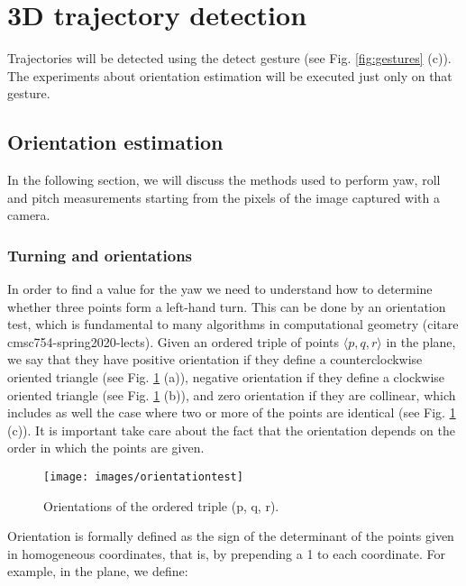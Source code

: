 \section{3D trajectory detection}
\label{sec:3dtraj}
Trajectories will be detected using the detect gesture (see Fig. \ref{fig:gestures} (c)). The experiments about orientation estimation will be executed just only on that gesture. 

\subsection{Orientation estimation}
\label{sec:orientationestimation}
In the following section, we will discuss the methods used to perform yaw, roll and pitch measurements starting from the pixels of the image captured with a camera.

\subsubsection{Turning and orientations}
\label{subsec:orientationtest}
In order to find a value for the yaw we need to understand how to determine whether three points form a left-hand turn. This can be done by an orientation test, which is fundamental to many algorithms in computational geometry (citare cmsc754-spring2020-lects). Given an ordered triple of points $\langle p, q, r \rangle$ in the plane, we say that they have positive orientation if they define a counterclockwise oriented triangle (see Fig. \ref{fig:orientationtest} (a)), negative orientation if they define a clockwise oriented triangle (see Fig. \ref{fig:orientationtest} (b)), and zero orientation if they are collinear, which includes as well the case where two or more of the points are identical (see Fig. \ref{fig:orientationtest} (c)). It is important take care about the fact that the orientation depends on the order in which the points are given.

\begin{figure}[H]
	\centering
	\texttt{[image: images/orientationtest]}
	\caption[Orientation test.]{Orientations of the ordered triple (p, q, r).}
	\label{fig:orientationtest}
\end{figure}

\noindent Orientation is formally defined as the sign of the determinant of the points given in homogeneous coordinates, that is, by prepending a 1 to each coordinate. For example, in the plane, we define:

